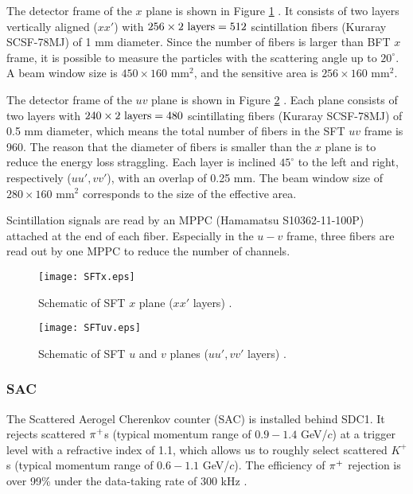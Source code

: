 The detector frame of the $x$ plane is shown in Figure \ref{fig-SFTx} \cite{Honda-D}. It consists of two layers vertically aligned ($xx'$) with $256\times2\ \rm{layers}=512$ scintillation fibers (Kuraray SCSF-78MJ) of 1 mm diameter. Since the number of fibers is larger than BFT $x$ frame, it is possible to measure the particles with the scattering angle up to $20^{\circ}$. A beam window size is $450\times160$ mm$^2$, and the sensitive area is $256\times160$ mm$^2$. 

The detector frame of the $uv$ plane is shown in Figure \ref{fig-SFTuv} \cite{Honda-D}. Each plane consists of two layers with $240\times2\ \rm{layers}=480$ scintillating fibers (Kuraray SCSF-78MJ) of 0.5 mm diameter, which means the total number of fibers in the SFT $uv$ frame is 960. The reason that the diameter of fibers is smaller than the $x$ plane is to reduce the energy loss straggling. Each layer is inclined $45^{\circ}$ to the left and right, respectively ($uu', vv'$), with an overlap of 0.25 mm. The beam window size of $280\times160$ mm$^2$ corresponds to the size of the effective area.

Scintillation signals are read by an MPPC (Hamamatsu S10362-11-100P) attached at the end of each fiber. Especially in the $u-v$ frame, three fibers are read out by one MPPC to reduce the number of channels. 

\begin{figure}[!h]
 \begin{center}
   \texttt{[image: SFTx.eps]}
   \caption{Schematic of SFT $x$ plane ($xx'$ layers) \cite{Honda-D}.}
   \label{fig-SFTx}
 \end{center}
\end{figure}

\begin{figure}[!h]
 \begin{center}
   \texttt{[image: SFTuv.eps]}
   \caption{Schematic of SFT $u$ and $v$ planes ($uu', vv'$ layers) \cite{Honda-D}.}
   \label{fig-SFTuv}
 \end{center}
\end{figure}


%
\subsubsection{SAC}
The Scattered Aerogel Cherenkov counter (SAC) is installed behind SDC1. It rejects scattered $\pi^{+}$s (typical momentum range of $0.9-1.4$ GeV/$c$) at a trigger level with a refractive index of 1.1, which allows us to roughly select scattered $K^+$s (typical momentum range of $0.6-1.1$ GeV/$c$). The efficiency of $\pi^{+}$ rejection is over 99\% under the data-taking rate of 300 kHz \cite{Koba-2016}. 

